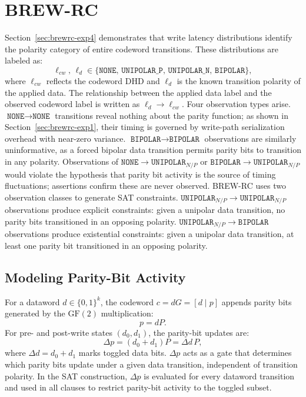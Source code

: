 \section{BREW-RC}
\label{sec:brewrc-method} Section~\ref{sec:brewrc-exp4} demonstrates
that write latency distributions identify the polarity category of
entire codeword transitions. These distributions are labeled as:
\begin{equation}
	\ell_{cw},\, \ell_d \in \{\texttt{NONE},\, \texttt{UNIPOLAR\_P},\, \texttt{UNIPOLAR\_N},\, \texttt{BIPOLAR}\},
\end{equation}
where $\ell_{cw}$ reflects the codeword DHD and $\ell_d$ is the known
transition polarity of the applied data. The relationship between the
applied data label and the observed codeword label is written as $\ell_d
	\to \ell_{cw}$. Four observation types arise. $\texttt{NONE} \to
	\texttt{NONE}$ transitions reveal nothing about the parity function; as
shown in Section~\ref{sec:brewrc-exp1}, their timing is governed by
write-path serialization overhead with near-zero variance.
$\texttt{BIPOLAR} \to \texttt{BIPOLAR}$ observations are similarly
uninformative, as a forced bipolar data transition permits parity bits
to transition in any polarity. Observations of $\texttt{NONE} \to
	\texttt{UNIPOLAR}_{N/P}$ or $\texttt{BIPOLAR} \to
	\texttt{UNIPOLAR}_{N/P}$ would violate the hypothesis that parity bit
activity is the source of timing fluctuations; assertions confirm these
are never observed. BREW-RC uses two observation classes to generate SAT
constraints. $\texttt{UNIPOLAR}_{N/P} \to \texttt{UNIPOLAR}_{N/P}$
observations produce explicit constraints: given a unipolar data
transition, no parity bits transitioned in an opposing polarity.
$\texttt{UNIPOLAR}_{N/P} \to \texttt{BIPOLAR}$ observations produce
existential constraints: given a unipolar data transition, at least one
parity bit transitioned in an opposing polarity.

\subsection{Modeling Parity-Bit Activity}
For a dataword $d \in \{0,1\}^k$, the codeword $c = dG = [d \mid p]$
appends parity bits generated by the $\mathrm{GF}(2)$ multiplication:
\begin{equation}
	p = dP.
\end{equation}
For pre- and post-write states $(d_0, d_1)$, the parity-bit updates are:
\begin{equation}
	\Delta p = (d_0 + d_1)P = \Delta d\, P,
\end{equation}
where $\Delta d = d_0 + d_1$ marks toggled data bits. $\Delta p$ acts as
a gate that determines which parity bits update under a given data
transition, independent of transition polarity. In the SAT construction,
$\Delta p$ is evaluated for every dataword transition and used in all
clauses to restrict parity-bit activity to the toggled subset.

